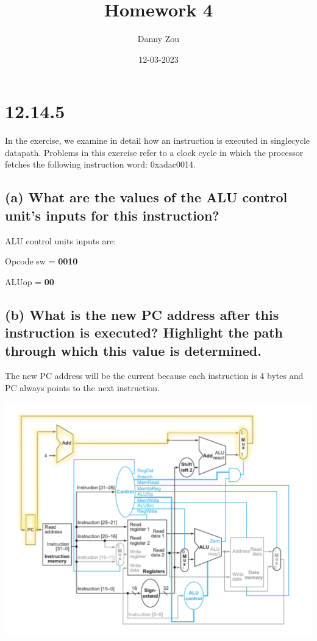 \documentclass{article}
\title{Homework 4}
\date{12-03-2023}
\author{Danny Zou}
\begin{document}
    \maketitle
    \onehalfspacing

    \section*{12.14.5}

    \noindent In the exercise, we examine in detail how an instruction is executed in singlecycle datapath. Problems in this exercise refer to a clock cycle in which the
processor fetches the following instruction word: 0xadac0014.

    \subsection*{(a) What are the values of the ALU control unit’s inputs
    for this instruction?}

    ALU control units inputs are:

    Opcode sw = \textbf{0010}

    ALUop = \textbf{00}

    \subsection*{(b) What is the new PC address after this instruction
    is executed? Highlight the path through which this
    value is determined.}

    \noindent The new PC address will be the current  because each instruction is 4 bytes and PC always points to the next instruction.

    \includegraphics[width=0.8\linewidth]{highlight.png}
\end{document}
